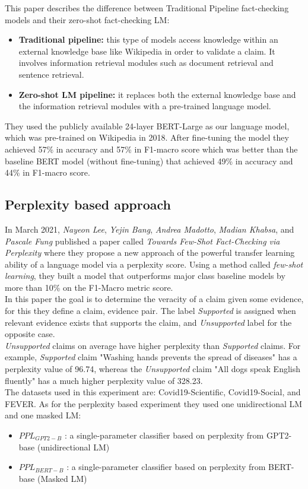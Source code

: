 \documentclass[conference]{IEEEtran}
\begin{document}
This paper describes the difference between Traditional Pipeline fact-checking models and their zero-shot fact-checking LM:

\begin{itemize}
\item \textbf{Traditional pipeline:} this type of models access knowledge within an external knowledge base like Wikipedia in order to validate a claim. It involves information retrieval modules such as document retrieval and sentence retrieval.
\item \textbf{Zero-shot LM pipeline:} it replaces both the external knowledge base and the information retrieval modules with a pre-trained language model.\\
\end{itemize}

They used the publicly available 24-layer BERT-Large as our language model, which was pre-trained on Wikipedia in 2018. After fine-tuning the model they achieved 57\% in accuracy and 57\% in F1-macro score which was better than the baseline BERT model (without fine-tuning) that achieved 49\% in accuracy and 44\% in F1-macro score.

\subsection{Perplexity based approach \cite{lee2021towards} \cite{lee2020misinformation}}
In March 2021, \textit{Nayeon Lee}, \textit{Yejin Bang}, \textit{Andrea Madotto}, \textit{Madian Khabsa}, and \textit{Pascale Fung} published a paper called \textit{Towards Few-Shot Fact-Checking via Perplexity} where they propose a new approach of the powerful transfer learning ability of a language model via a perplexity score. Using a method called \textit{few-shot learning}, they built a model that outperforms major class baseline models by more than 10\% on the F1-Macro metric score.\\
In this paper the goal is to determine the veracity of a claim given some evidence, for this they define a {claim, evidence} pair. The label \emph{Supported} is assigned when relevant evidence exists that supports the claim, and \emph{Unsupported} label for the opposite case.\\
\emph{Unsupported} claims on average have higher perplexity than \emph{Supported} claims. For example, \emph{Supported} claim "Washing hands prevents the spread of diseases" has a perplexity value of 96.74, whereas the \emph{Unsupported} claim "All dogs speak English fluently" has a much higher perplexity value of 328.23.\\
The datasets used in this experiment are: Covid19-Scientific, Covid19-Social, and FEVER. As for the perplexity based experiment they used one unidirectional LM and one masked LM:
\begin{itemize}
\item $PPL_{GPT2-B}$ : a single-parameter classifier based on perplexity from GPT2-base \cite{radford2019language} (unidirectional LM)
\item $PPL_{BERT-B}$ : a single-parameter classifier based on perplexity from BERT-base \cite{devlin2018bert} (Masked LM)\\
\end{itemize}
\end{document}
